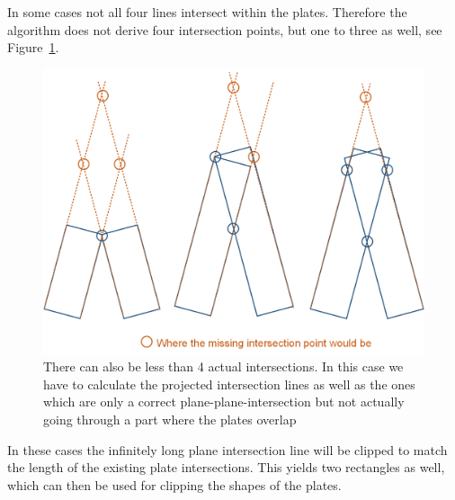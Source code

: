 \documentclass[../ClassicThesis.tex]{subfiles}
\begin{document}
In some cases not all four lines intersect within the plates. Therefore the algorithm does not derive four intersection points, but one to three as well, see Figure~\ref{fig:casesOfLines}. 
\begin{figure}[!ht]
\centering
\includegraphics[width=\columnwidth]{Images/10-joints-casesOfLines.png}
\caption{There can also be less than 4 actual intersections. In this case we have to calculate the projected intersection lines as well as the ones which are only a correct plane-plane-intersection but not actually going through a part where the plates overlap}
\label{fig:casesOfLines}
\end{figure}

In these cases the infinitely long plane intersection line will be clipped to match the length of the existing plate intersections. This yields two rectangles as well, which can then be used for clipping the shapes of the plates.
\end{document}
